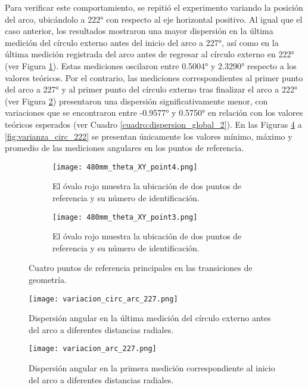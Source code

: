 Para verificar este comportamiento, se repitió el experimento variando la posición del arco, ubicándolo a 222° con respecto al eje horizontal positivo. Al igual que el caso anterior, los resultados mostraron una mayor dispersión en la última medición del círculo externo antes del inicio del arco a 227°, así como en la última medición registrada del arco antes de regresar al círculo externo en 222° (ver Figura \ref{fig:point3}). Estas mediciones oscilaron entre 0.5004° y 2.3290° respecto a los valores teóricos. Por el contrario, las mediciones correspondientes al primer punto del arco a 227° y al primer punto del círculo externo tras finalizar el arco a 222°  (ver Figura \ref{fig:point4}) presentaron una dispersión significativamente menor, con variaciones que se encontraron entre -0.9577° y 0.5750° en relación con los valores teóricos esperados (ver Cuadro \ref{cuadro:dispersion_global_2}). En las Figuras \ref{fig:varianza_circ_227} a \ref{fig:varianza_circ_222} se presentan únicamente los valores mínimo, máximo y promedio de las mediciones angulares en los puntos de referencia.

\begin{figure}[H]
	\centering
	\begin{subfigure}{0.8\textwidth}
		\centering
		\texttt{[image: 480mm\_theta\_XY\_point4.png]}
		\caption{El óvalo rojo muestra la ubicación de dos puntos de referencia y su número de identificación.}
		\label{fig:point3}
		\vspace{1em}
	\end{subfigure}
	\begin{subfigure}{0.8\textwidth}
		\centering
		\texttt{[image: 480mm\_theta\_XY\_point3.png]}
		\caption{El óvalo rojo muestra la ubicación de dos puntos de referencia y su número de identificación.}
		\label{fig:point4}
	\end{subfigure}
	\caption{Cuatro puntos de referencia principales en las transiciones de geometría.}
	\label{fig:points2}
\end{figure}

\begin{figure}[H]
	\centering
	\texttt{[image: variacion\_circ\_arc\_227.png]}
	\caption{Dispersión angular en la última medición del círculo externo antes del arco a diferentes distancias radiales.}
	\label{fig:varianza_circ_227}
\end{figure}

\begin{figure}[H]
	\centering
	\texttt{[image: variacion\_arc\_227.png]}
	\caption{Dispersión angular en la primera medición correspondiente al inicio del arco a diferentes distancias radiales.}
	\label{fig:varianza_arc_227}
\end{figure}

